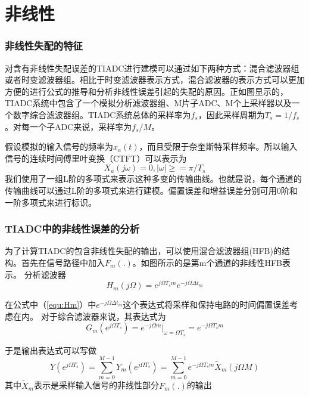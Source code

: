 


\chapter{非线性}
\subsection{非线性失配的特征}
对含有非线性失配误差的TIADC进行建模可以通过如下两种方式：混合滤波器组或者时变滤波器组。相比于时变滤波器表示方式，混合滤波器的表示方式可以更加方便的进行公式的推导和分析非线性误差引起的失配的原因。正如图显示的，TIADC系统中包含了一个模拟分析滤波器组、M片子ADC、M个上采样器以及一个数字综合滤波器组。TIADC系统总体的采样率为$f_s$，因此采样周期为$T_s=1/f_s$。对每一个子ADC来说，采样率为$f_s/M$。
\par
假设模拟的输入信号的频率为$x_a(t)$，而且受限于奈奎斯特采样频率。所以输入信号的连续时间傅里叶变换（CTFT）可以表示为
\begin{equation}
	X_a(j\omega)=0,\left| \omega \right|\geq=\pi/T_s
\end{equation}
我们使用了一组L阶的多项式来表示这种多变的传输曲线。也就是说，每个通道的传输曲线可以通过L阶的多项式来进行建模。偏置误差和增益误差分别可用0阶和一阶多项式来进行标识。

\subsection{TIADC中的非线性误差的分析}
为了计算TIADC的包含非线性失配的输出，可以使用混合滤波器组(HFB)的结构。首先在信号路径中加入$F_m( . )$。如图所示的是第m个通道的非线性HFB表示。
分析滤波器
\begin{equation}
\label{equ:Hm}
H_m(j\Omega)={e^{j\Omega {T_s}m}}{e^{ - j\Omega \Delta {t_m}}}
\end{equation}

在公式中（\ref{equ:Hm}）中$e^{-j\Omega \Delta {t_m}}$这个表达式将采样和保持电路的时间偏置误差考虑在内。
对于综合滤波器来说，其表达式为
\begin{equation}
	G_m(e^{j\Omega T_s})=e^{-j\Omega m} | _{\omega =\Omega T_s} = e^{-j\Omega T_s m}
\end{equation}



于是输出表达式可以写做
\begin{equation}
\label{equ:}
	Y\left(e^{j\Omega T_s}\right)=\sum_{m=0}^{M-1} Y_m\left(e^{j\Omega T_s}\right)=\sum_{m=0}^{M-1}e^{-j\Omega T_s m}{\tilde X_m(j\Omega M)}
\end{equation}
其中$\tilde X_m$表示是采样输入信号的非线性部分$F_m(.)$的输出

